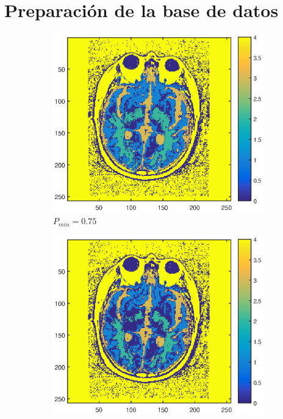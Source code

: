 \documentclass[11pt]{article} %
\begin{document}
\section{Preparación de la base de datos}

\begin{figure}[h]
	\centering
	\begin{subfigure}[b]{0.435\textwidth}
		\includegraphics[width=\textwidth]{../1_DB/labels_075.eps}
		\caption[]{\small $P_{min} = 0.75$}
		\label{fig:db:075}
	\end{subfigure}
	\quad
	\begin{subfigure}[b]{0.435\textwidth}
		\includegraphics[width=\textwidth]{../1_DB/labels_085.eps}

\end{subfigure}
\end{figure}
\end{document}

